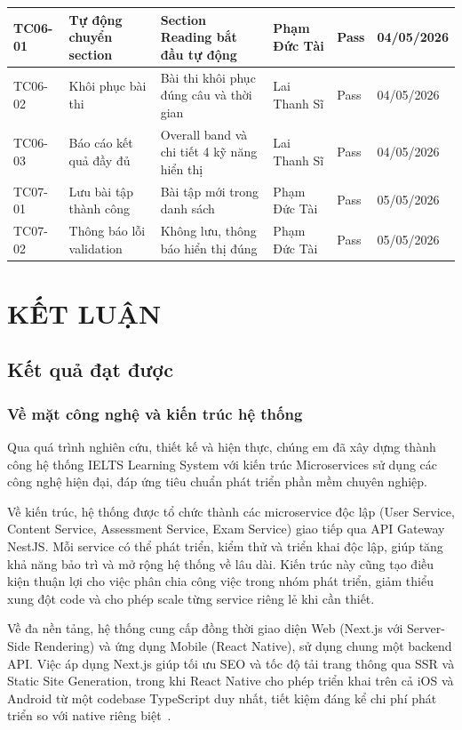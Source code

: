 \documentclass[a4paper,12pt]{extreport}
\begin{document}
\begin{longtable}{|p{1.3cm}|p{3.5cm}|p{3.5cm}|p{2.5cm}|p{1.5cm}|p{1.5cm}|}
    TC06-01 & Tự động chuyển section & Section Reading bắt đầu tự động & Phạm Đức Tài & Pass & 04/05/2026 \\ \hline
    TC06-02 & Khôi phục bài thi & Bài thi khôi phục đúng câu và thời gian & Lai Thanh Sĩ & Pass & 04/05/2026 \\ \hline
    TC06-03 & Báo cáo kết quả đầy đủ & Overall band và chi tiết 4 kỹ năng hiển thị & Lai Thanh Sĩ & Pass & 04/05/2026 \\ \hline
    TC07-01 & Lưu bài tập thành công & Bài tập mới trong danh sách & Phạm Đức Tài & Pass & 05/05/2026 \\ \hline
    TC07-02 & Thông báo lỗi validation & Không lưu, thông báo hiển thị đúng & Phạm Đức Tài & Pass & 05/05/2026 \\ \hline

\end{longtable}

\chapter{KẾT LUẬN}

\section{Kết quả đạt được}

\subsection{Về mặt công nghệ và kiến trúc hệ thống}

Qua quá trình nghiên cứu, thiết kế và hiện thực, chúng em đã xây dựng thành công hệ thống IELTS Learning System với kiến trúc Microservices sử dụng các công nghệ hiện đại, đáp ứng tiêu chuẩn phát triển phần mềm chuyên nghiệp.

Về kiến trúc, hệ thống được tổ chức thành các microservice độc lập (User Service, Content Service, Assessment Service, Exam Service) giao tiếp qua API Gateway NestJS. Mỗi service có thể phát triển, kiểm thử và triển khai độc lập, giúp tăng khả năng bảo trì và mở rộng hệ thống về lâu dài. Kiến trúc này cũng tạo điều kiện thuận lợi cho việc phân chia công việc trong nhóm phát triển, giảm thiểu xung đột code và cho phép scale từng service riêng lẻ khi cần thiết.

Về đa nền tảng, hệ thống cung cấp đồng thời giao diện Web (Next.js với Server-Side Rendering) và ứng dụng Mobile (React Native), sử dụng chung một backend API. Việc áp dụng Next.js giúp tối ưu SEO và tốc độ tải trang thông qua SSR và Static Site Generation, trong khi React Native cho phép triển khai trên cả iOS và Android từ một codebase TypeScript duy nhất, tiết kiệm đáng kể chi phí phát triển so với native riêng biệt~\cite{reactnative-docs}.
\end{document}
